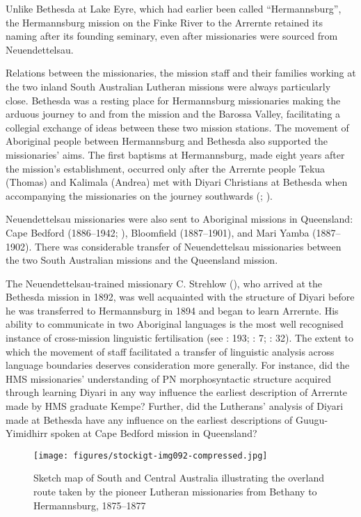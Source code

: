 Unlike Bethesda at Lake Eyre, which had earlier been called ``Hermannsburg'', the Hermannsburg mission on the Finke River to the Arrernte retained its naming after its founding seminary, even after missionaries were sourced from Neuendettelsau.

Relations between the missionaries, the mission staff and their families working at the two inland South Australian Lutheran missions were always particularly close. Bethesda was a resting place for Hermannsburg missionaries making the arduous journey to and from the mission and the Barossa Valley, facilitating a collegial exchange of ideas between these two mission stations. The movement of Aboriginal people between Hermannsburg and Bethesda also supported the missionaries' aims. The first baptisms at Hermannsburg, made eight years after the mission’s establishment, occurred only after the Arrernte people Tekua (Thomas) and Kalimala (Andrea) met with Diyari Christians at Bethesda when accompanying the missionaries on the journey southwards (\citealt[398]{harris_one_1994}; \citealt[41]{Latz2014}).

Neuendettelsau missionaries were also sent to Aboriginal missions in Queensland: Cape Bedford (1886--1942; ), Bloomfield (1887--1901), and Mari Yamba (1887--1902). There was considerable transfer of Neuendettelsau missionaries between the two South Australian missions and the Queensland mission.

The Neuendettelsau-trained missionary C. Strehlow (), who arrived at the Bethesda mission in 1892, was well acquainted with the structure of Diyari before he was transferred to Hermannsburg in 1894 and began to learn Arrernte. His ability to communicate in two Aboriginal languages is the most well recognised instance of cross-mission linguistic fertilisation (see \citealt{hebart_united_1938}: 193; \citealt{albrecht_mission_2002}: 7; \citealt{kenny_missionary_2008}: 32). The extent to which the movement of staff facilitated a transfer of linguistic analysis across language boundaries deserves consideration more generally. For instance, did the HMS missionaries' understanding of PN morphosyntactic structure acquired through learning Diyari in any way influence the earliest description of Arrernte made by HMS graduate Kempe? Further, did the Lutherans' analysis of Diyari made at Bethesda have any influence on the earliest descriptions of Guugu-Yimidhirr spoken at Cape Bedford mission in Queensland?

\begin{figure}
 \texttt{[image: figures/stockigt-img092-compressed.jpg]}
\caption{Sketch map of South and Central Australia illustrating the overland route taken by the pioneer Lutheran missionaries from Bethany to Hermannsburg, 1875--1877 \citep{Scherer1971}}
\label{fig:key:sketchmap}
\end{figure}

